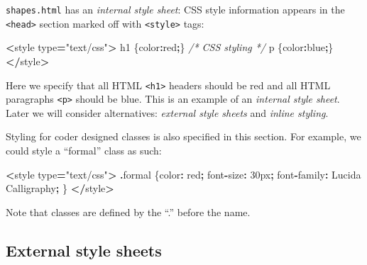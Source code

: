 \documentclass[
  openany]{book}
\newenvironment{Shaded}{\begin{snugshade}}{\end{snugshade}}
\newcommand{\AttributeTok}[1]{\textcolor[rgb]{0.77,0.63,0.00}{#1}}
\newcommand{\CommentTok}[1]{\textcolor[rgb]{0.56,0.35,0.01}{\textit{#1}}}
\newcommand{\DataTypeTok}[1]{\textcolor[rgb]{0.13,0.29,0.53}{#1}}
\newcommand{\NormalTok}[1]{#1}
\newcommand{\OperatorTok}[1]{\textcolor[rgb]{0.81,0.36,0.00}{\textbf{#1}}}
\newcommand{\StringTok}[1]{\textcolor[rgb]{0.31,0.60,0.02}{#1}}
\begin{document}
\texttt{shapes.html} has an \emph{internal style sheet}: CSS style information appears in the \texttt{\textless{}head\textgreater{}} section marked off with \texttt{\textless{}style\textgreater{}} tags:

\begin{Shaded}
\begin{Highlighting}[]
\OperatorTok{\textless{}}\NormalTok{style type}\OperatorTok{=}\StringTok{"text/css"}\OperatorTok{\textgreater{}}
\NormalTok{    h1 \{}\DataTypeTok{color}\OperatorTok{:}\NormalTok{red}\OperatorTok{;}\NormalTok{\}     }\CommentTok{/* CSS styling */}
\NormalTok{    p \{}\DataTypeTok{color}\OperatorTok{:}\NormalTok{blue}\OperatorTok{;}\NormalTok{\}}
\OperatorTok{\textless{}/}\NormalTok{style}\OperatorTok{\textgreater{}}
\end{Highlighting}
\end{Shaded}

Here we specify that all HTML \texttt{\textless{}h1\textgreater{}} headers should be red and all HTML paragraphs \texttt{\textless{}p\textgreater{}} should be blue. This is an example of an \emph{internal style sheet}. Later we will consider alternatives: \emph{external style sheets} and \emph{inline styling}.

Styling for coder designed classes is also specified in this section. For example, we could style a ``formal'' class as such:

\begin{Shaded}
\begin{Highlighting}[]
\OperatorTok{\textless{}}\NormalTok{style type}\OperatorTok{=}\StringTok{"text/css"}\OperatorTok{\textgreater{}}
    \OperatorTok{.}\AttributeTok{formal}\NormalTok{ \{}\DataTypeTok{color}\OperatorTok{:}\NormalTok{ red}\OperatorTok{;}        
\NormalTok{        font}\OperatorTok{{-}}\DataTypeTok{size}\OperatorTok{:}\NormalTok{ 30px}\OperatorTok{;}
\NormalTok{        font}\OperatorTok{{-}}\DataTypeTok{family}\OperatorTok{:}\NormalTok{ Lucida Calligraphy}\OperatorTok{;}
\NormalTok{        \}   }
\OperatorTok{\textless{}/}\NormalTok{style}\OperatorTok{\textgreater{}}
\end{Highlighting}
\end{Shaded}

Note that classes are defined by the ``.'' before the name.

\hypertarget{external-style-sheets}{%
\subsection{External style sheets}\label{external-style-sheets}}
\end{document}
